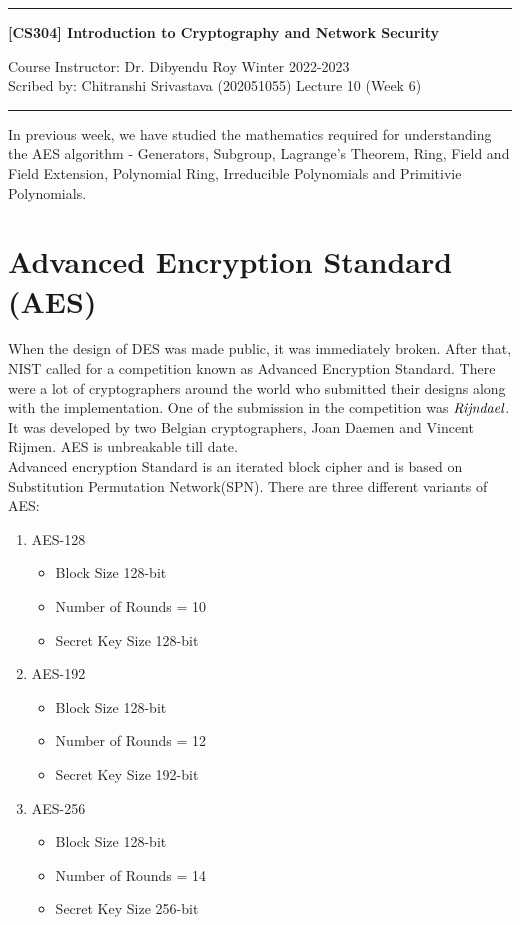 \documentclass[11pt]{article}
\begin{document}
\noindent
\rule{\textwidth}{1pt}
\begin{center}
{\bf [CS304] Introduction to Cryptography and Network Security}
\end{center}
Course Instructor: Dr. Dibyendu Roy \hfill Winter 2022-2023\\
Scribed by: Chitranshi Srivastava (202051055) \hfill Lecture 10 (Week 6)
\\
\rule{\textwidth}{1pt}

In previous week, we have studied the mathematics required for understanding the AES algorithm - Generators, Subgroup, Lagrange's Theorem, Ring, Field and Field Extension, Polynomial Ring, Irreducible Polynomials and Primitivie Polynomials.

\section{Advanced Encryption Standard (AES)}

When the design of DES was made public, it was immediately broken. After that, NIST called for a competition known as Advanced Encryption Standard. There were a lot of cryptographers around the world who submitted their designs along with the implementation. One of the submission in the competition was $\emph{Rijndael}$. It was developed by two Belgian cryptographers, Joan Daemen and Vincent Rijmen. AES is unbreakable till date.\\

Advanced encryption Standard is an iterated block cipher and is based on Substitution Permutation Network(SPN). There are three different variants of AES:
\begin{enumerate}
    \item AES-128 
    \begin{itemize}
        \item Block Size 128-bit
        \item Number of Rounds = 10
        \item Secret Key Size 128-bit
    \end{itemize}    
    \item AES-192
    \begin{itemize}
        \item Block Size 128-bit
        \item Number of Rounds = 12
        \item Secret Key Size 192-bit
    \end{itemize}    
    \item AES-256 
    \begin{itemize}
        \item Block Size 128-bit
        \item Number of Rounds = 14
        \item Secret Key Size 256-bit
    \end{itemize}    
\end{enumerate}
\end{document}
